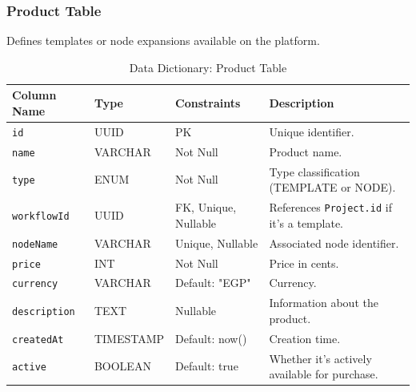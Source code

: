 \subsubsection{Product Table}
Defines templates or node expansions available on the platform.
\begin{table}[H]
\centering
\renewcommand{\arraystretch}{1.3}
\begin{tabularx}{\textwidth}{|l|l|l|X|}
\hline
\textbf{Column Name} & \textbf{Type} & \textbf{Constraints} & \textbf{Description} \\
\hline
\texttt{id} & UUID & PK & Unique identifier. \\
\hline
\texttt{name} & VARCHAR & Not Null & Product name. \\
\hline
\texttt{type} & ENUM & Not Null & Type classification (TEMPLATE or NODE). \\
\hline
\texttt{workflowId} & UUID & FK, Unique, Nullable & References \texttt{Project.id} if it's a template. \\
\hline
\texttt{nodeName} & VARCHAR & Unique, Nullable & Associated node identifier. \\
\hline
\texttt{price} & INT & Not Null & Price in cents. \\
\hline
\texttt{currency} & VARCHAR & Default: "EGP" & Currency. \\
\hline
\texttt{description} & TEXT & Nullable & Information about the product. \\
\hline
\texttt{createdAt} & TIMESTAMP & Default: now() & Creation time. \\
\hline
\texttt{active} & BOOLEAN & Default: true & Whether it's actively available for purchase. \\
\hline
\end{tabularx}
\caption{Data Dictionary: Product Table}
\label{tab:dict-product}
\end{table}

